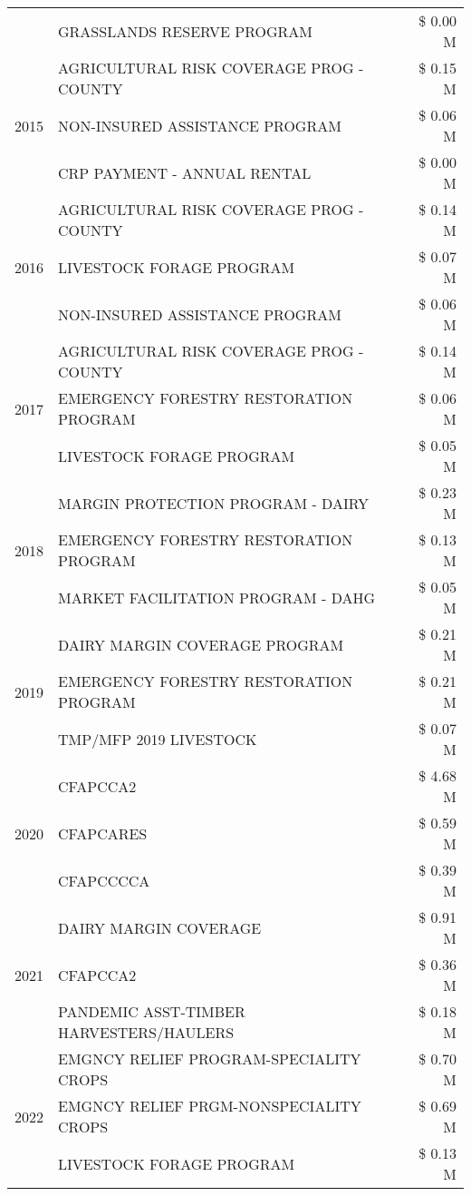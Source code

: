 \begin{tabular}{llr}
 & GRASSLANDS RESERVE PROGRAM & \$ 0.00 M \\
\cline{1-3}
\multirow[t]{3}{*}{2015} & AGRICULTURAL RISK COVERAGE PROG - COUNTY & \$ 0.15 M \\
 & NON-INSURED ASSISTANCE PROGRAM & \$ 0.06 M \\
 & CRP PAYMENT - ANNUAL RENTAL & \$ 0.00 M \\
\cline{1-3}
\multirow[t]{3}{*}{2016} & AGRICULTURAL RISK COVERAGE PROG - COUNTY & \$ 0.14 M \\
 & LIVESTOCK FORAGE PROGRAM & \$ 0.07 M \\
 & NON-INSURED ASSISTANCE PROGRAM & \$ 0.06 M \\
\cline{1-3}
\multirow[t]{3}{*}{2017} & AGRICULTURAL RISK COVERAGE PROG - COUNTY & \$ 0.14 M \\
 & EMERGENCY FORESTRY RESTORATION PROGRAM & \$ 0.06 M \\
 & LIVESTOCK FORAGE PROGRAM & \$ 0.05 M \\
\cline{1-3}
\multirow[t]{3}{*}{2018} & MARGIN PROTECTION PROGRAM - DAIRY & \$ 0.23 M \\
 & EMERGENCY FORESTRY RESTORATION PROGRAM & \$ 0.13 M \\
 & MARKET FACILITATION PROGRAM - DAHG & \$ 0.05 M \\
\cline{1-3}
\multirow[t]{3}{*}{2019} & DAIRY MARGIN COVERAGE PROGRAM & \$ 0.21 M \\
 & EMERGENCY FORESTRY RESTORATION PROGRAM & \$ 0.21 M \\
 & TMP/MFP 2019 LIVESTOCK & \$ 0.07 M \\
\cline{1-3}
\multirow[t]{3}{*}{2020} & CFAPCCA2 & \$ 4.68 M \\
 & CFAPCARES & \$ 0.59 M \\
 & CFAPCCCCA & \$ 0.39 M \\
\cline{1-3}
\multirow[t]{3}{*}{2021} & DAIRY MARGIN COVERAGE & \$ 0.91 M \\
 & CFAPCCA2 & \$ 0.36 M \\
 & PANDEMIC ASST-TIMBER HARVESTERS/HAULERS & \$ 0.18 M \\
\cline{1-3}
\multirow[t]{3}{*}{2022} & EMGNCY RELIEF PROGRAM-SPECIALITY CROPS & \$ 0.70 M \\
 & EMGNCY RELIEF PRGM-NONSPECIALITY CROPS & \$ 0.69 M \\
 & LIVESTOCK FORAGE PROGRAM & \$ 0.13 M \\
\cline{1-3}
\bottomrule
\end{tabular}
